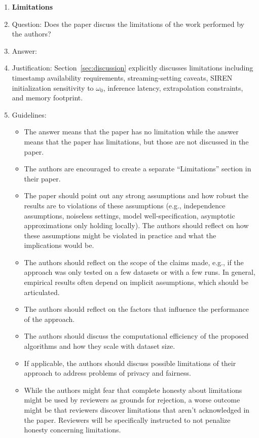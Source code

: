 \begin{enumerate}
\item {\bf Limitations}
    \item[] Question: Does the paper discuss the limitations of the work performed by the authors?
    \item[] Answer: \answerYes{}
    \item[] Justification: Section~\ref{sec:discussion} explicitly discusses limitations including timestamp availability requirements, streaming-setting caveats, SIREN initialization sensitivity to $\omega_0$, inference latency, extrapolation constraints, and memory footprint.
    \item[] Guidelines:
    \begin{itemize}
        \item The answer \answerNA{} means that the paper has no limitation while the answer \answerNo{} means that the paper has limitations, but those are not discussed in the paper.
        \item The authors are encouraged to create a separate ``Limitations'' section in their paper.
        \item The paper should point out any strong assumptions and how robust the results are to violations of these assumptions (e.g., independence assumptions, noiseless settings, model well-specification, asymptotic approximations only holding locally). The authors should reflect on how these assumptions might be violated in practice and what the implications would be.
        \item The authors should reflect on the scope of the claims made, e.g., if the approach was only tested on a few datasets or with a few runs. In general, empirical results often depend on implicit assumptions, which should be articulated.
        \item The authors should reflect on the factors that influence the performance of the approach.
        \item The authors should discuss the computational efficiency of the proposed algorithms and how they scale with dataset size.
        \item If applicable, the authors should discuss possible limitations of their approach to address problems of privacy and fairness.
        \item While the authors might fear that complete honesty about limitations might be used by reviewers as grounds for rejection, a worse outcome might be that reviewers discover limitations that aren't acknowledged in the paper. Reviewers will be specifically instructed to not penalize honesty concerning limitations.
    \end{itemize}


\end{enumerate}
